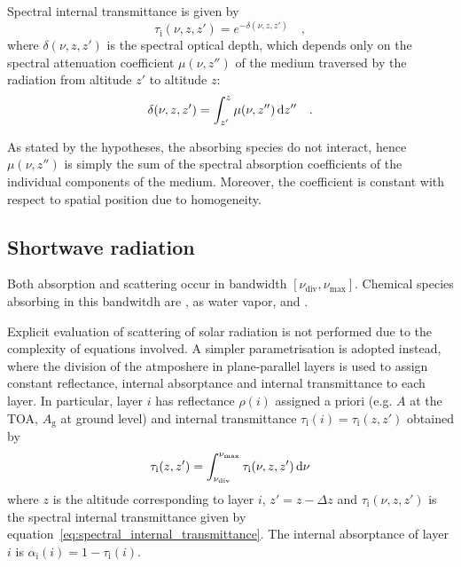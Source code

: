 \documentclass[a4paper,10pt,twocolumn,\classoptions]{article}
\begin{document}
Spectral internal transmittance is given by
\begin{equation}
  \label{eq:spectral_internal_transmittance}
  \tau_\text{i}(\nu, z, z') = e^{-\delta(\nu, z, z')}
  \quad ,
\end{equation}
where $\delta(\nu, z, z')$ is the spectral optical depth, which depends only on the spectral attenuation coefficient $\mu(\nu, z'')$ of the medium traversed by the radiation from altitude $z'$ to altitude $z$:
\begin{equation}
  \label{eq:spectral_optical_thickness}
  \delta(\nu, z, z') = \int_{z'}^{z} \mu(\nu, z'') \odif{z''}
  \quad .
\end{equation}

As stated by the hypotheses, the absorbing species do not interact, hence $\mu(\nu, z'')$ is simply the sum of the spectral absorption coefficients of the individual components of the medium. Moreover, the coefficient is constant with respect to spatial position due to homogeneity.




\subsection{Shortwave radiation}
\label{sec:Shortwave radiation}
Both absorption and scattering occur in bandwidth $[\nu_\text{div}, \nu_\text{max}]$.
Chemical species absorbing in this bandwitdh are ,  as water vapor,  and .

Explicit evaluation of scattering of solar radiation is not performed due to the complexity of equations involved. A simpler parametrisation is adopted instead, where the division of the atmposhere in plane-parallel layers is used to assign constant reflectance, internal absorptance and internal transmittance to each layer.
In particular, layer $i$ has reflectance $\rho(i)$ assigned a priori (e.g. $A$ at the TOA, $A_\text{g}$ at ground level) and internal transmittance $\tau_\text{i}(i) = \tau_\text{i}(z, z')$ obtained by
\begin{equation}
  \label{eq:internal_transmittance}
  \tau_\text{i}(z, z') = \int_{\nu_\text{div}}^{\nu_\text{max}} \tau_\text{i}(\nu, z, z') \odif{\nu}
\end{equation}
where $z$ is the altitude corresponding to layer $i$, $z' = z - \Delta z$ and $\tau_\text{i}(\nu, z, z')$ is the spectral internal transmittance given by equation~\eqref{eq:spectral_internal_transmittance}. The internal absorptance of layer $i$ is $\alpha_\text{i}(i) = 1 - \tau_\text{i}(i)$.
\end{document}
